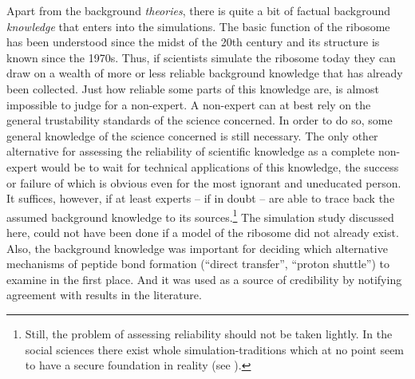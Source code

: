 \documentclass[onecollarge]{STJour}
\numberwithin{equation}{section}
\begin{document}
Apart from the background {\em theories}, there is quite a bit of factual
background {\em knowledge} that enters into the simulations. The basic
function of the ribosome has been understood since the midst of the 20th
century and its structure is known since the 1970s. Thus, if scientists
simulate the ribosome today they can draw on a wealth of more or less
reliable background knowledge that has already been collected. Just how
reliable some parts of this knowledge are, is almost impossible to judge
for a non-expert. A non-expert can at best rely on the general
trustability standards of the science concerned. In order to do so, some
general knowledge of the science concerned is still necessary. The only
other alternative for assessing the reliability of scientific knowledge
as a complete non-expert would be to wait for technical applications of this
knowledge, the success or failure of which is obvious even for the most
ignorant and uneducated person. It suffices, however, if at least experts
-- if in doubt -- are able to trace back the assumed background knowledge
to its sources.\footnote{Still, the problem of assessing reliability
should not be taken lightly. In the social sciences there exist whole
simulation-traditions which at no point seem to have a secure foundation
in reality (see \citet{arnold:2008}).} The simulation study discussed
here, could not have been done if a model of the ribosome did not already
exist. Also, the background knowledge was important for deciding which
alternative mechanisms of peptide bond formation (``direct transfer'',
``proton shuttle'') to examine in the first place. And it was used as a
source of credibility by notifying agreement with results in the
literature.
\end{document}

